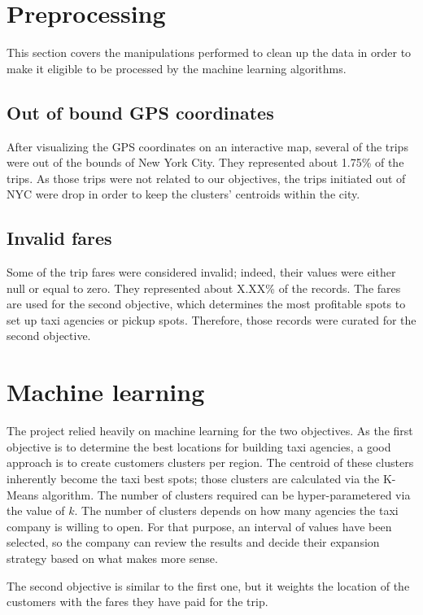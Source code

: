 \documentclass[a4paper]{article}
\begin{document}
\section{Preprocessing}
This section covers the manipulations performed to clean up the data in order to make it eligible to be processed by the machine learning algorithms.

\subsection{Out of bound GPS coordinates}
After visualizing the GPS coordinates on an interactive map, several of the trips were out of the bounds of New York City. They represented about 1.75\% of the trips. As those trips were not related to our objectives, the trips initiated out of NYC were drop in order to keep the clusters' centroids within the city.

\subsection{Invalid fares}
Some of the trip fares were considered invalid; indeed, their values were either null or equal to zero. They represented about X.XX\% of the records. The fares are used for the second objective, which determines the most profitable spots to set up taxi agencies or pickup spots. Therefore, those records were curated for the second objective.

\section{Machine learning}
The project relied heavily on machine learning for the two objectives. As the first objective is to determine the best locations for building taxi agencies, a good approach is to create customers clusters per region. The centroid of these clusters inherently become the taxi best spots; those clusters are calculated via the K-Means algorithm. The number of clusters required can be hyper-parametered via the value of $k$. The number of clusters depends on how many agencies the taxi company is willing to open. For that purpose, an interval of values have been selected, so the company can review the results and decide their expansion strategy based on what makes more sense.

The second objective is similar to the first one, but it weights the location of the customers with the fares they have paid for the trip.
\end{document}
